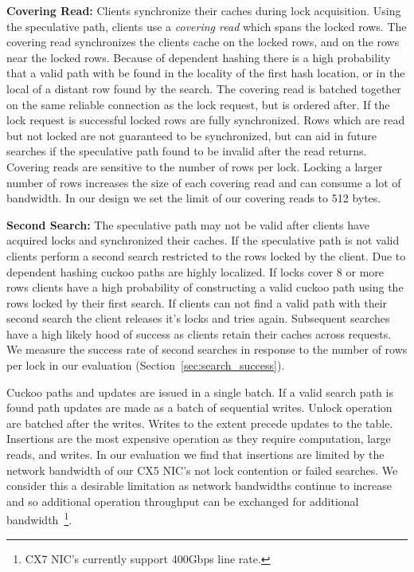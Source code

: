\textbf{Covering Read:} Clients synchronize their caches
during lock acquisition.  Using the speculative path,
clients use a \textit{covering read} which spans the locked
rows. The covering read synchronizes the clients cache on
the locked rows, and on the rows near the locked rows.
Because of dependent hashing there is a high probability
that a valid path with be found in the locality of the first
hash location, or in the local of a distant row found by the
search. The covering read is batched together on the same
reliable connection as the lock request, but is ordered
after. If the lock request is successful locked rows are
fully synchronized. Rows which are read but not locked are
not guaranteed to be synchronized, but can aid in future
searches if the speculative path found to be invalid after
the read returns. Covering reads are sensitive to the number
of rows per lock. Locking a larger number of rows increases
the size of each covering read and can consume a lot of
bandwidth. In our design we set the limit of our covering
reads to 512 bytes.

\textbf{Second Search:} The speculative path may not be
valid after clients have acquired locks and synchronized
their caches. If the speculative path is not valid clients
perform a second search restricted to the rows locked by the
client. Due to dependent hashing cuckoo paths are highly
localized. If locks cover 8 or more rows clients have a high
probability of constructing a valid cuckoo path using the
rows locked by their first search. If clients can not find a
valid path with their second search the client releases it's
locks and tries again. Subsequent searches have a high
likely hood of success as clients retain their caches across
requests. We measure the success rate of second searches in
response to the number of rows per lock in our evaluation
(Section~\ref{sec:search_success}).

Cuckoo paths and updates are issued in a single batch. If a
valid search path is found path updates are made as a batch
of sequential writes. Unlock operation are batched after the
writes. Writes to the extent precede updates to the table.
Insertions are the most expensive operation as they require
computation, large reads, and writes. In our evaluation we
find that insertions are limited by the network bandwidth of
our CX5 NIC's not lock contention or failed searches. We
consider this a desirable limitation as network bandwidths
continue to increase and so additional operation throughput
can be exchanged for additional bandwidth~\footnote{CX7
NIC's currently support 400Gbps line rate.}.


